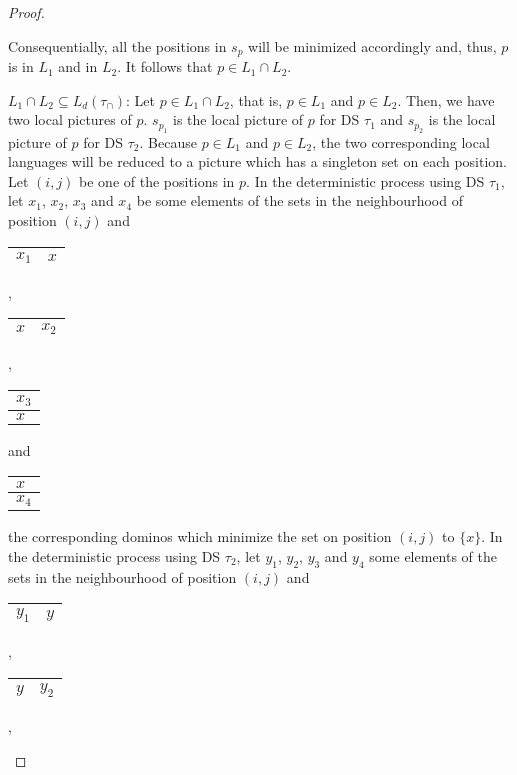 \begin{proof}
\begin{compactitem}
Consequentially, all the positions in $s_p$ will be minimized accordingly and, thus, $p$ is in
$L_1$ and in $L_2$. It follows that $p\in L_1 \cap L_2$.
\item $L_1\cap L_2 \subseteq L_d(\tau_{\cap})$: \newline
Let $p \in L_1\cap L_2$, that is, $p \in L_1$ and $p \in L_2$. Then, we have two local
pictures of $p$. $s_{p_1}$ is the local picture of $p$ for DS $\tau_1$ and $s_{p_2}$ is the local picture of
$p$ for DS $\tau_2$. Because $p \in L_1$ and $p \in L_2$, the two corresponding local languages will
be reduced to a picture which has a singleton set on each position. Let $(i, j)$ be
one of the positions in $p$.
In the deterministic process using DS $\tau_1$, let $x_1$, $x_2$, $x_3$ and $x_4$ be some elements
of the sets in the neighbourhood of position $(i, j)$ and
\begin{tabular}{|C{0.8cm}|C{0.8cm}|} 
\hline 
$x_1$ & \hspace{0.07cm}$x$\hspace{0.07cm} \tabularnewline 
\hline 
\end{tabular}, 
\begin{tabular}{|C{0.8cm}|C{0.8cm}|} 
\hline 
\hspace{0.07cm}$x$\hspace{0.07cm} & $x_2$ \tabularnewline 
\hline 
\end{tabular}, 
\begin{tabular}{|C{0.8cm}|} 
\hline 
$x_3$ \tabularnewline 
\hline
$x$ \tabularnewline
\hline 
\end{tabular} 
and 
\begin{tabular}{|C{0.8cm}|} 
\hline 
$x$ \tabularnewline 
\hline
$x_4$ \tabularnewline
\hline 
\end{tabular}
the corresponding dominos which minimize the set on position $(i, j)$ to $\lbrace x\rbrace$. In
the deterministic process using DS $\tau_2$, let $y_1$, $y_2$, $y_3$ and $y_4$ some elements of the
sets in the neighbourhood of position $(i, j)$ and
\begin{tabular}{|C{0.8cm}|C{0.8cm}|} 
\hline 
$y_1$ & \hspace{0.07cm}$y$\hspace{0.07cm} \tabularnewline 
\hline 
\end{tabular}, 
\begin{tabular}{|C{0.8cm}|C{0.8cm}|} 
\hline 
\hspace{0.07cm}$y$\hspace{0.07cm} & $y_2$ \tabularnewline 
\hline 
\end{tabular}, 

\end{compactitem}
\end{proof}
